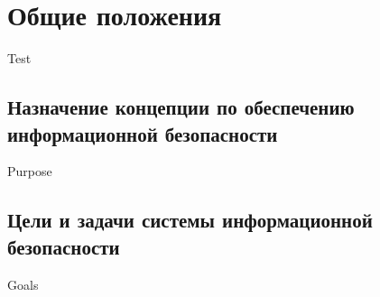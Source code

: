 
\section{Общие положения}
\label{sec:general}

Test

\subsection{Назначение концепции по обеспечению информационной безопасности}
\label{subsec:general:purpose}

Purpose

\subsection{Цели и задачи системы информационной безопасности}
\label{subsec:general:goals}

Goals
